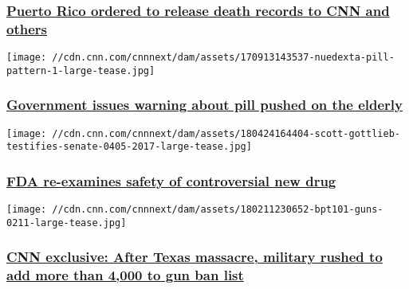 \hypertarget{puerto-rico-ordered-to-release-death-records-to-cnn-and-others}{%
\subsubsection{\texorpdfstring{\href{/2018/06/05/us/puerto-rico-hurricane-maria-death-records/index.html}{Puerto
Rico ordered to release death records to CNN and
others}}{Puerto Rico ordered to release death records to CNN and others}}\label{puerto-rico-ordered-to-release-death-records-to-cnn-and-others}}

\href{/2018/06/04/health/nuedexta-government-warning-insurers-invs/index.html}{}

\texttt{[image: //cdn.cnn.com/cnnnext/dam/assets/170913143537-nuedexta-pill-pattern-1-large-tease.jpg]}

\hypertarget{government-issues-warning-about-pill-pushed-on-the-elderly--1}{%
\subsubsection{\texorpdfstring{\href{/2018/06/04/health/nuedexta-government-warning-insurers-invs/index.html}{Government
issues warning about pill pushed on the elderly
}}{Government issues warning about pill pushed on the elderly }}\label{government-issues-warning-about-pill-pushed-on-the-elderly--1}}

\href{/2018/04/25/health/fda-nuplazid-safety-evaluation-invs/index.html}{}

\texttt{[image: //cdn.cnn.com/cnnnext/dam/assets/180424164404-scott-gottlieb-testifies-senate-0405-2017-large-tease.jpg]}

\hypertarget{fda-re-examines-safety-of-controversial-new-drug-1}{%
\subsubsection{\texorpdfstring{\href{/2018/04/25/health/fda-nuplazid-safety-evaluation-invs/index.html}{FDA
re-examines safety of controversial new
drug}}{FDA re-examines safety of controversial new drug}}\label{fda-re-examines-safety-of-controversial-new-drug-1}}

\href{/2018/02/12/us/gun-background-check-backlog-military-dishonorable-discharge-invs/index.html}{}

\texttt{[image: //cdn.cnn.com/cnnnext/dam/assets/180211230652-bpt101-guns-0211-large-tease.jpg]}

\hypertarget{cnn-exclusive-after-texas-massacre-military-rushed-to-add-more-than-4000-to-gun-ban-list-1}{%
\subsubsection{\texorpdfstring{\href{/2018/02/12/us/gun-background-check-backlog-military-dishonorable-discharge-invs/index.html}{CNN
exclusive: After Texas massacre, military rushed to add more than 4,000
to gun ban
list}}{CNN exclusive: After Texas massacre, military rushed to add more than 4,000 to gun ban list}}\label{cnn-exclusive-after-texas-massacre-military-rushed-to-add-more-than-4000-to-gun-ban-list-1}}

